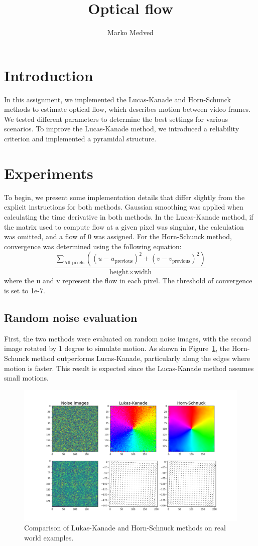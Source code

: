 \documentclass[9pt]{IEEEtran}
\title{\vspace{0ex}
Optical flow}
\author{Marko Medved\vspace{-4.0ex}}
\begin{document}
\maketitle

\section{Introduction}
In this assignment, we implemented the Lucas-Kanade and Horn-Schunck methods to estimate optical flow,
 which describes motion between video frames. We tested different parameters to determine the best settings
  for various scenarios. To improve the Lucas-Kanade method, we introduced a reliability criterion and 
  implemented a pyramidal structure.

\section{Experiments}
To begin, we present some implementation details that differ slightly from the explicit instructions
 for both methods. Gaussian smoothing was applied when calculating the time derivative in both methods.
In the Lucas-Kanade method, if the matrix used to compute flow at a given pixel was singular, the 
calculation was omitted, and a flow of 0 was assigned.
For the Horn-Schunck method, convergence was determined using the following equation: \[
\frac{\sum\limits_{\text{All pixels}} \left( (u - u_{\text{previous}})^2 + (v - v_{\text{previous}})^2 \right)}{\text{height} \times \text{width}}
\] where the u and v represent the flow in each pixel. The threshold of convergence is set 
to 1e-7. 

\subsection{Random noise evaluation}
First, the two methods were evaluated on random noise images, with the second image rotated by 1 degree 
to simulate motion. As shown in Figure~\ref{fig:LK_noise}, the Horn-Schunck method outperforms 
Lucas-Kanade, particularly along the edges where motion is faster. This result is expected since the 
Lucas-Kanade method assumes small motions.

\begin{figure}[h]
    \centering
    \includegraphics[width=0.8\columnwidth]{figures/noise.png}
    \caption{Comparison of Lukas-Kanade and Horn-Schnuck methods on real world examples.}
    \label{fig:LK_noise}
\end{figure}
\end{document}
